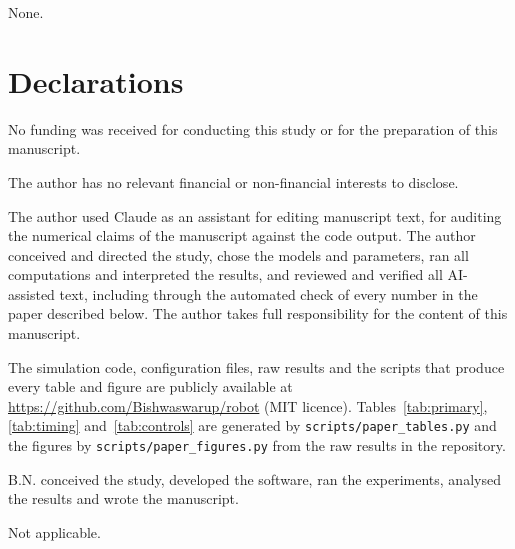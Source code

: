 \documentclass[pdflatex,sn-mathphys-num]{sn-jnl}
\begin{document}
None.

\section*{Declarations}

No funding was received for conducting this study or for the preparation of this manuscript.

The author has no relevant financial or non-financial interests to disclose.

The author used Claude as an assistant for editing
manuscript text, for auditing the numerical claims of the manuscript against the code
output. The author conceived and directed
the study, chose the models and parameters, ran all computations and interpreted
the results, and reviewed and verified all AI-assisted text, including through the automated check of every number in the paper described below. The author takes full
responsibility for the content of this manuscript.

The simulation code, configuration files, raw results and the scripts that produce every table and figure
are publicly available at \url{https://github.com/Bishwaswarup/robot} (MIT licence). Tables~\ref{tab:primary},
\ref{tab:timing} and~\ref{tab:controls} are generated by \texttt{scripts/paper\_tables.py} and the figures by
\texttt{scripts/paper\_figures.py} from the raw results in the repository.

B.N. conceived the study, developed the software, ran the experiments, analysed the results and wrote the
manuscript.

Not applicable.
\end{document}
